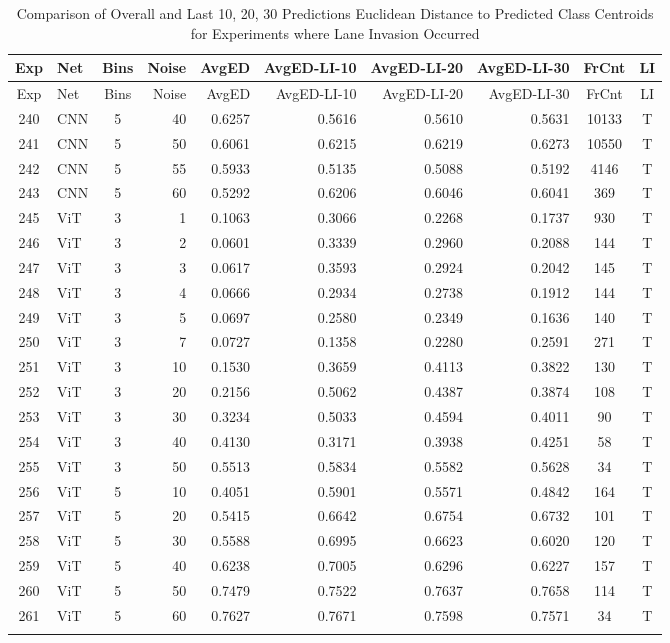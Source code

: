 \begin{longtable}{@{}clcrrrrrcc@{}}
\toprule
Exp & Net & Bins & Noise & AvgED & AvgED-LI-10 & AvgED-LI-20 & AvgED-LI-30 & FrCnt & LI \\
\midrule
\endfirsthead
\toprule
Exp & Net & Bins & Noise & AvgED & AvgED-LI-10 & AvgED-LI-20 & AvgED-LI-30 & FrCnt & LI \\
\midrule
\endhead
240 & CNN & 5 & 40 & 0.6257 & 0.5616 & 0.5610 & 0.5631 & 10133 & T \\
241 & CNN & 5 & 50 & 0.6061 & 0.6215 & 0.6219 & 0.6273 & 10550 & T \\
242 & CNN & 5 & 55 & 0.5933 & 0.5135 & 0.5088 & 0.5192 & 4146 & T \\
243 & CNN & 5 & 60 & 0.5292 & 0.6206 & 0.6046 & 0.6041 & 369 & T \\
245 & ViT & 3 & 1 & 0.1063 & 0.3066 & 0.2268 & 0.1737 & 930 & T \\
246 & ViT & 3 & 2 & 0.0601 & 0.3339 & 0.2960 & 0.2088 & 144 & T \\
247 & ViT & 3 & 3 & 0.0617 & 0.3593 & 0.2924 & 0.2042 & 145 & T \\
248 & ViT & 3 & 4 & 0.0666 & 0.2934 & 0.2738 & 0.1912 & 144 & T \\
249 & ViT & 3 & 5 & 0.0697 & 0.2580 & 0.2349 & 0.1636 & 140 & T \\
250 & ViT & 3 & 7 & 0.0727 & 0.1358 & 0.2280 & 0.2591 & 271 & T \\
251 & ViT & 3 & 10 & 0.1530 & 0.3659 & 0.4113 & 0.3822 & 130 & T \\
252 & ViT & 3 & 20 & 0.2156 & 0.5062 & 0.4387 & 0.3874 & 108 & T \\
253 & ViT & 3 & 30 & 0.3234 & 0.5033 & 0.4594 & 0.4011 & 90 & T \\
254 & ViT & 3 & 40 & 0.4130 & 0.3171 & 0.3938 & 0.4251 & 58 & T \\
255 & ViT & 3 & 50 & 0.5513 & 0.5834 & 0.5582 & 0.5628 & 34 & T \\
256 & ViT & 5 & 10 & 0.4051 & 0.5901 & 0.5571 & 0.4842 & 164 & T \\
257 & ViT & 5 & 20 & 0.5415 & 0.6642 & 0.6754 & 0.6732 & 101 & T \\
258 & ViT & 5 & 30 & 0.5588 & 0.6995 & 0.6623 & 0.6020 & 120 & T \\
259 & ViT & 5 & 40 & 0.6238 & 0.7005 & 0.6296 & 0.6227 & 157 & T \\
260 & ViT & 5 & 50 & 0.7479 & 0.7522 & 0.7637 & 0.7658 & 114 & T \\
261 & ViT & 5 & 60 & 0.7627 & 0.7671 & 0.7598 & 0.7571 & 34 & T \\
\bottomrule
\caption{Comparison of Overall and Last 10, 20, 30 Predictions Euclidean Distance to Predicted Class Centroids for Experiments where Lane Invasion Occurred}
\label{tab:li_ed_comparison}
\end{longtable}


